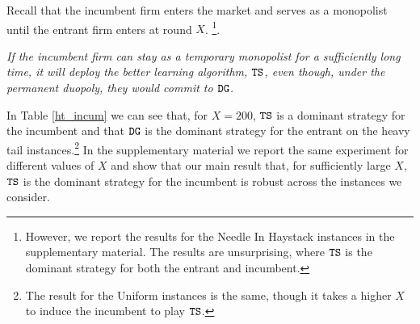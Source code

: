\documentclass[../competing_bandits.tex]{subfiles}
\begin{document}
 Recall that the incumbent firm enters the
market and serves as a monopolist until the entrant firm enters at
round $X$.  \footnote{However, we report the
  results for the Needle In Haystack instances in the supplementary
  material. The results are unsurprising, where $\mathtt{TS}$ is the dominant
  strategy for both the entrant and incumbent.}.

 

\begin{finding}
  \textit{If the incumbent firm can stay as a temporary monopolist for
    a sufficiently long time, it will deploy the better learning
    algorithm, $\mathtt{TS}$, even though, under the permanent duopoly, they
    would commit to $\mathtt{DG}$.}
\end{finding}

In Table \ref{ht_incum} we can see that, for $X = 200$, $\mathtt{TS}$ is a dominant strategy for the incumbent and that $\mathtt{DG}$ is the dominant strategy for the entrant on the heavy tail instances.\footnote{The result for the Uniform instances is the same, though it takes a higher $X$ to induce the incumbent to play $\mathtt{TS}$.} In the supplementary material we report the same experiment for different values of $X$ and show that our main result that, for sufficiently large $X$, $\mathtt{TS}$ is the dominant strategy for the incumbent is robust across the instances we consider.
\end{document}
